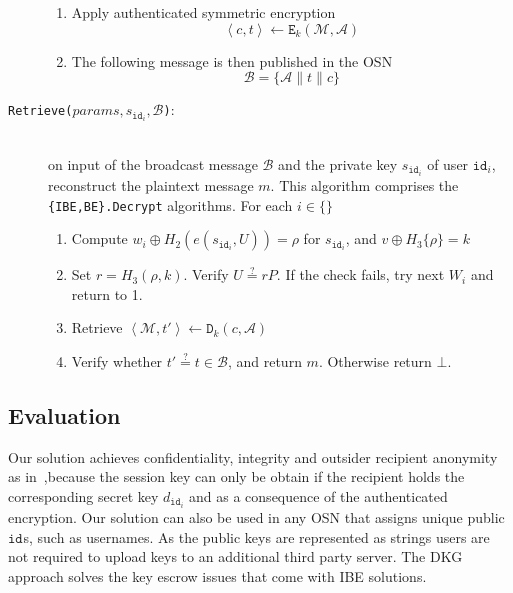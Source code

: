 \documentclass[journal]{IEEEtran}
\newcommand{\id}[1]{\ensuremath{\mathtt{id}_{#1}}}
\begin{document}
\begin{description}
\begin{enumerate}
        \item Apply authenticated symmetric encryption
        \begin{equation*}
            \left< c, t \right> \leftarrow \mathtt{E}_k(\mathcal{M},\mathcal{A})
        \end{equation*}
        \item The following message is then published in the OSN
        \begin{equation*}
            \mathcal{B} = \{ \mathcal{A} \parallel t \parallel c \}
        \end{equation*}
    \end{enumerate}
    
    \bigskip
    
    \item[\texttt{Retrieve($params, s_{\id{i}}, \mathcal{B}$)}:]~\\ on input of the broadcast message $\mathcal{B}$ and the private key $s_{\id{i}}$ of user $\id{i}$, reconstruct the plaintext message $m$. This algorithm comprises the \texttt{\{IBE,BE\}.Decrypt} algorithms. For each $i \in \{  \}$ \\

    \begin{enumerate}
        \item Compute $w_i \oplus H_2 \left( e \left( s_{\id{i}}, U \right) \right) = \rho$ for $s_{\id{i}}$, and $v \oplus H_3 \{ \rho \} = k$ 
        \item Set $r = H_3 \left( \rho, k \right)$. Verify $U \stackrel{?}{=} rP$. If the check fails, try next $W_i$ and return to 1.
        \item Retrieve $\left< \mathcal{M}, t' \right> \leftarrow \mathtt{D}_k(c, \mathcal{A})$
        \item Verify whether $t' \stackrel{?}{=} t \in \mathcal{B} $, and return $m$. Otherwise return $\bot$. 
    \end{enumerate}
\end{description}



\subsection{Evaluation}

Our solution achieves confidentiality, integrity and outsider recipient anonymity as in~\cite{BarthBonehWaters,BonehFranklinIBE,FazioOutsiderANOBE},because the session key can only be obtain if the recipient holds the corresponding secret key $d_{\id{i}}$ and as a consequence of the authenticated encryption. Our solution can also be used in any OSN that assigns unique public \id{}s, such as usernames. As the public keys are represented as strings  users are not required to upload keys to an additional third party server. The DKG approach solves the key escrow issues that come with IBE solutions.
\end{document}
